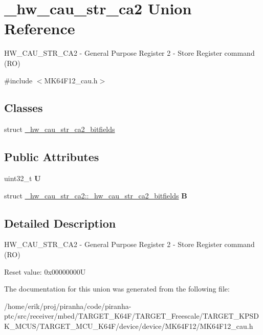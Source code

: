 \hypertarget{union__hw__cau__str__ca2}{}\section{\+\_\+hw\+\_\+cau\+\_\+str\+\_\+ca2 Union Reference}
\label{union__hw__cau__str__ca2}


H\+W\+\_\+\+C\+A\+U\+\_\+\+S\+T\+R\+\_\+\+C\+A2 -\/ General Purpose Register 2 -\/ Store Register command (RO)  




{\ttfamily \#include $<$M\+K64\+F12\+\_\+cau.\+h$>$}

\subsection*{Classes}
\begin{DoxyCompactItemize}
\item 
struct \hyperlink{struct__hw__cau__str__ca2_1_1__hw__cau__str__ca2__bitfields}{\+\_\+hw\+\_\+cau\+\_\+str\+\_\+ca2\+\_\+bitfields}
\end{DoxyCompactItemize}
\subsection*{Public Attributes}
\begin{DoxyCompactItemize}
\item 
uint32\+\_\+t {\bfseries U}\hypertarget{union__hw__cau__str__ca2_a218ddaa30d97052aafb14dd6b20f4ca1}{}\label{union__hw__cau__str__ca2_a218ddaa30d97052aafb14dd6b20f4ca1}

\item 
struct \hyperlink{struct__hw__cau__str__ca2_1_1__hw__cau__str__ca2__bitfields}{\+\_\+hw\+\_\+cau\+\_\+str\+\_\+ca2\+::\+\_\+hw\+\_\+cau\+\_\+str\+\_\+ca2\+\_\+bitfields} {\bfseries B}\hypertarget{union__hw__cau__str__ca2_ab50e6c7e5e759c5c3aa355fa57e2351f}{}\label{union__hw__cau__str__ca2_ab50e6c7e5e759c5c3aa355fa57e2351f}

\end{DoxyCompactItemize}


\subsection{Detailed Description}
H\+W\+\_\+\+C\+A\+U\+\_\+\+S\+T\+R\+\_\+\+C\+A2 -\/ General Purpose Register 2 -\/ Store Register command (RO) 

Reset value\+: 0x00000000U 

The documentation for this union was generated from the following file\+:\begin{DoxyCompactItemize}
\item 
/home/erik/proj/piranha/code/piranha-\/ptc/src/receiver/mbed/\+T\+A\+R\+G\+E\+T\+\_\+\+K64\+F/\+T\+A\+R\+G\+E\+T\+\_\+\+Freescale/\+T\+A\+R\+G\+E\+T\+\_\+\+K\+P\+S\+D\+K\+\_\+\+M\+C\+U\+S/\+T\+A\+R\+G\+E\+T\+\_\+\+M\+C\+U\+\_\+\+K64\+F/device/device/\+M\+K64\+F12/M\+K64\+F12\+\_\+cau.\+h\end{DoxyCompactItemize}
